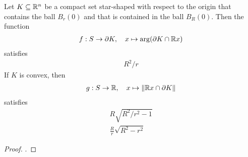 \documentclass[10pt,a4paper]{article}
\begin{document}
\begin{lemma}
    Let $K \subseteq {\mathbb R}^{n}$ be a compact set star-shaped with respect to the origin 
    that contains the ball $B_{r}(0)$ and that is contained in the ball $B_{R}(0)$. Then the function 
    \begin{align*}
        f : S \rightarrow \partial K, \quad x \mapsto \arg( \partial K \cap {\mathbb R} x )
    \end{align*}
    satisfies 
    \begin{align*}
        R^{2}/r %
    \end{align*}
    If $K$ is convex, then 
    \begin{align*}
        g : S \rightarrow {\mathbb R}, \quad x \mapsto \| {\mathbb R} x \cap \partial K \|
    \end{align*}
    satisfies 
    \begin{align*}
        R \sqrt{ R^{2} / r^{2} - 1 } %
        \\
        \frac R r \sqrt{ R^{2} - r^{2} } %
    \end{align*}
\end{lemma}
\begin{proof}
    .
\end{proof}


    
    
    
    
    
    
    
    
    
    
\end{document}
